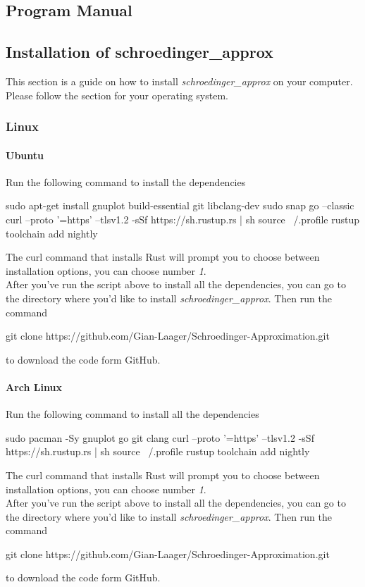 \documentclass[11pt,DIV=10,final]{scrreprt} %
\begin{document}
\begin{appendix} %
%

\chapter{Program Manual}\label{sec:manual}
\section{Installation of schroedinger\_approx}
This section is a guide on how to install \emph{schroedinger\_approx} on your computer. Please follow the section for your operating system.
\subsection{Linux}
\subsubsection{Ubuntu}
Run the following command to install the dependencies
\begin{bashcode}
sudo apt-get install gnuplot build-essential git libclang-dev
sudo snap go --classic
curl --proto '=https' --tlsv1.2 -sSf https://sh.rustup.rs | sh
source ~/.profile
rustup toolchain add nightly
\end{bashcode}
The curl command that installs Rust will prompt you to choose between installation options, you can choose number \emph{1}.
\\[3ex]
After you've run the script above to install all the dependencies, you can go to the directory where you'd like to install \emph{schroedinger\_approx}. Then run the command
\begin{bashcode}
git clone https://github.com/Gian-Laager/Schroedinger-Approximation.git
\end{bashcode}
to download the code form GitHub.

\subsubsection{Arch Linux}
Run the following command to install all the dependencies
\begin{bashcode}
sudo pacman -Sy gnuplot go git clang
curl --proto '=https' --tlsv1.2 -sSf https://sh.rustup.rs | sh
source ~/.profile
rustup toolchain add nightly
\end{bashcode}
The curl command that installs Rust will prompt you to choose between installation options, you can choose number \emph{1}.
\\[3ex]
After you've run the script above to install all the dependencies, you can go to the directory where you'd like to install \emph{schroedinger\_approx}. Then run the command
\begin{bashcode}
git clone https://github.com/Gian-Laager/Schroedinger-Approximation.git
\end{bashcode}
to download the code form GitHub.


\end{appendix}
\end{document}
